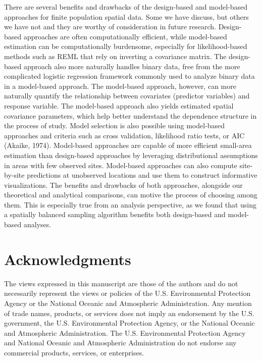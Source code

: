 \documentclass[]{elsarticle} %
\begin{document}
There are several benefits and drawbacks of the design-based and
model-based approaches for finite population spatial data. Some we have
discuss, but others we have not and they are worthy of consideration in
future research. Design-based approaches are often computationally
efficient, while model-based estimation can be computationally
burdensome, especially for likelihood-based methods such as REML that
rely on inverting a covariance matrix. The design-based approach also
more naturally handles binary data, free from the more complicated
logistic regression framework commonly used to analyze binary data in a
model-based approach. The model-based approach, however, can more
naturally quantify the relationship between covariates (predictor
variables) and response variable. The model-based approach also yields
estimated spatial covariance parameters, which help better understand
the dependence structure in the process of study. Model selection is
also possible using model-based approaches and criteria such as cross
validation, likelihood ratio tests, or AIC (Akaike, 1974). Model-based
approaches are capable of more efficient small-area estimation than
design-based approaches by leveraging distributional assumptions in
areas with few observed sites. Model-based approaches can also compute
site-by-site predictions at unobserved locations and use them to
construct informative visualizations. The benefits and drawbacks of both
approaches, alongside our theoretical and analytical comparisons, can
motive the process of choosing among them. This is especially true from
an analysis perspective, as we found that using a spatially balanced
sampling algorithm benefits both design-based and model-based analyses.

\hypertarget{acknowledgments}{%
\section*{Acknowledgments}\label{acknowledgments}}

The views expressed in this manuscript are those of the authors and do
not necessarily represent the views or policies of the U.S.
Environmental Protection Agency or the National Oceanic and Atmospheric
Administration. Any mention of trade names, products, or services does
not imply an endorsement by the U.S. government, the U.S. Environmental
Protection Agency, or the National Oceanic and Atmospheric
Administration. The U.S. Environmental Protection Agency and National
Oceanic and Atmospheric Administration do not endorse any commercial
products, services, or enterprises.
\end{document}
